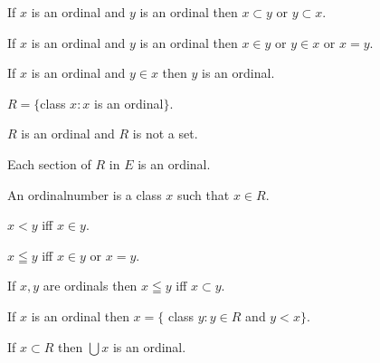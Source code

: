 \documentclass[a4paper,draft]{amsproc}
\begin{document}
\begin{forthel}
\begin{theorem}[109]
If $x$ is an ordinal and $y$ is an ordinal then $x \subset y$ or $y \subset x$.
\end{theorem}

\begin{theorem}[110]
If $x$ is an ordinal and $y$ is an ordinal then $x \in y$ or $y \in x$ or $x = y$.
\end{theorem}

\begin{theorem}[111]
If $x$ is an ordinal and $y \in x$ then $y$ is an ordinal.
\end{theorem}

\begin{definition}
$R = \{$class $x : x$ is an ordinal$\}$.
\end{definition}

\begin{theorem}[113]
$R$ is an ordinal and $R$ is not a set.
\end{theorem}

\begin{theorem}[114]
Each section of $R$ in $E$ is an ordinal.
\end{theorem}

\begin{definition}[115]
An ordinalnumber is a class $x$ such that $x \in R$.
\end{definition}

\begin{definition}[116]
$x < y$ iff $x \in y$.
\end{definition}

\begin{definition}[117]
$x \leqq y$ iff $x \in y$ or $x = y$.
\end{definition}

\begin{theorem}[118]
If $x, y$ are ordinals then $x \leqq y$ iff $x \subset y$.
\end{theorem}

\begin{theorem}[119]
If $x$ is an ordinal then $x = \{$ class $y : y \in R$ and $y < x\}$.
\end{theorem}

\begin{theorem}[120]
If $x \subset R$ then $\bigcup x$ is an ordinal.
\end{theorem}


\end{forthel}
\end{document}
